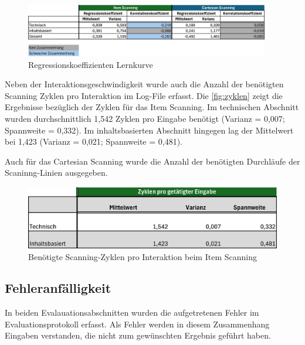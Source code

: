 \begin{figure}[tbh]
    \centering
    \includegraphics[width=0.95\textwidth]{images/Results/Regressionskoeffizienten-Korrelation-Table-Lernkurve-Geschwindigkeit.png}
    \caption{Regressionskoeffizienten Lernkurve}
    \label{fig:RegressionskoeffizientenTable}
\end{figure}

Neben der Interaktionsgeschwindigkeit wurde auch die Anzahl der benötigten Scanning Zyklen pro Interaktion im Log-File erfasst. Die \autoref{fig:zyklen} zeigt die Ergebnisse bezüglich der Zyklen für das Item Scanning. Im technischen Abschnitt wurden durchschnittlich 1,542 Zyklen pro Eingabe benötigt (Varianz = 0,007; Spannweite = 0,332). Im inhaltsbasierten Abschnitt hingegen lag der Mittelwert bei 1,423 (Varianz = 0,021; Spannweite = 0,481).

Auch für das Cartesian Scanning wurde die Anzahl der benötigten Durchläufe der Scaninng-Linien ausgegeben. %

\begin{figure}[tbh]
    \centering
    \includegraphics{images/Results/Zyklen-Item.png}
    \caption{Benötigte Scanning-Zyklen pro Interaktion beim Item Scanning}
    \label{fig:zyklen}
\end{figure}

\subsection{Fehleranfälligkeit}

In beiden Evalauationsabschnitten wurden die aufgetretenen Fehler im Evaluationsprotokoll erfasst. Als Fehler werden in diesem Zusammenhang Eingaben verstanden, die nicht zum gewünschten Ergebnis geführt haben. 

